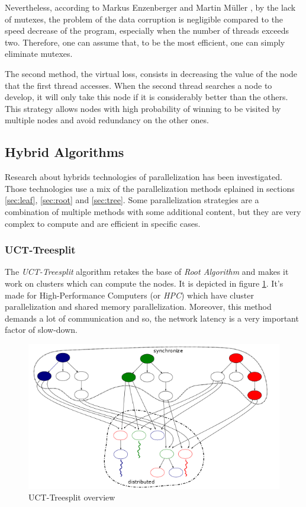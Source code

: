 Nevertheless, according to Markus Enzenberger and Martin Müller \cite{lock-free}, by the lack of mutexes, the problem of the data corruption is negligible compared to the speed decrease of the program, especially when the number of threads exceeds two. Therefore, one can assume that, to be the most efficient, one can simply eliminate mutexes.
\newline

The second method, the virtual loss, consists in decreasing the value of the node that the first thread accesses. When the second thread searches a node to develop, it will only take this node if it is considerably better than the others. This strategy allows nodes with high probability of winning to be visited by multiple nodes and avoid redundancy on the other ones.

\subsection{Hybrid Algorithms}

Research about hybrids technologies of parallelization has been investigated. Those technologies use a mix of the parallelization methods eplained in sections \ref{sec:leaf}, \ref{sec:root} and \ref{sec:tree}. Some parallelization strategies are a combination of multiple methods with some additional content, but they are very complex to compute and are efficient in specific cases.


\subsubsection{UCT-Treesplit}

The \emph{UCT-Treesplit} algorithm\cite{treesplit} retakes the base of \emph{Root Algorithm} and makes it work on clusters which can compute the nodes. %
It is depicted in figure \ref{treesplit}. It’s made for High-Performance Computers (or \emph{HPC}) which have cluster parallelization and shared memory parallelization. Moreover, this method demands a lot of communication and so, the network latency is a very important factor of slow-down.

\begin{figure}[!h] 
\centerline{\includegraphics[scale=0.60]{4_Strategies_and_state_of_the_art/4.1Strategy_of_root_parallelization_Mikail/treesplit.png}}
   \caption{\label{étiquette} UCT-Treesplit overview}
\label{treesplit}
\end{figure}

